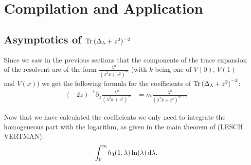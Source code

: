 \section{Compilation and Application}

\subsection{Asymptotics of $\Tr{(\Delta_\lambda + z^2)^{-2}}$}
Since we saw in the previous sections that the components of the trace expansion
of the resolvent are of the form $\frac{\lambda^n}{(\lambda^2 k + z^2)^m}$ (with
$k$ being one of $V(0)$, $V(1)$ and $V(x)$) we get the following formula for the
coefficients of $\Tr{(\Delta_\lambda + z^2)}^{-2}$:
\begin{align}
  (-2z)^{-1} \partial_z \frac{\lambda^n}{(\lambda^2 k + z^2)^{m}}
    &= m \frac{\lambda^n}{(\lambda^2 k + z^2)^{m+1}}
\end{align}

Now that we have calculated the coefficients we only need to integrate the
homogeneous part with the logarithm, as given in the main theorem of (LESCH
VERTMAN):
\begin{align*}
  \Integ[\infty]{0}{\lambda}{h_3(1,\lambda)\ln(\lambda)}.
\end{align*}

